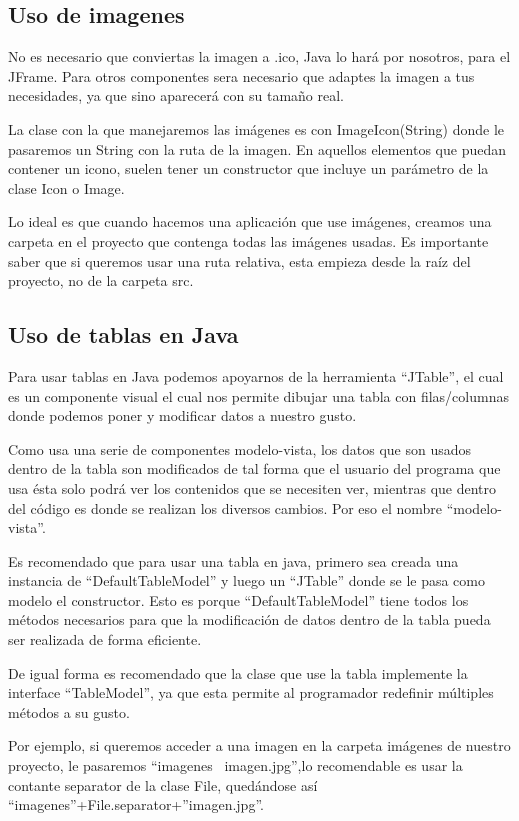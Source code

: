 \documentclass[12pt,a4paper]{report}
\begin{document}
{\subsection*{Uso de imagenes}
No es necesario que conviertas la imagen a .ico, Java lo hará por nosotros, para el JFrame. Para otros componentes sera necesario que adaptes la imagen a tus necesidades, ya que sino aparecerá con su tamaño real.

La clase con la que manejaremos las imágenes es con ImageIcon(String) donde le pasaremos un String con la ruta de la imagen. En aquellos elementos que puedan contener un icono, suelen tener un constructor que incluye un parámetro de la clase Icon o Image.

Lo ideal es que cuando hacemos una aplicación que use imágenes, creamos una carpeta en el proyecto que contenga todas las imágenes usadas. Es importante saber que si queremos usar una ruta relativa, esta empieza desde la raíz del proyecto, no de la carpeta src.



\subsection*{Uso de tablas en Java}
Para usar tablas en Java podemos apoyarnos de la herramienta “JTable”, el cual es un componente visual el cual nos permite dibujar una tabla con filas/columnas donde podemos poner y modificar datos a nuestro gusto.

Como usa una serie de componentes modelo-vista, los datos que son usados dentro de la tabla son modificados de tal forma que el usuario del programa que usa ésta solo podrá ver los contenidos que se necesiten ver, mientras que dentro del código es donde se realizan los diversos cambios. Por eso el nombre “modelo-vista”.

Es recomendado que para usar una tabla en java, primero sea creada una instancia de “DefaultTableModel” y luego un “JTable” donde se le pasa como modelo el constructor. Esto es porque “DefaultTableModel” tiene todos los métodos necesarios para que la modificación de datos dentro de la tabla pueda ser realizada de forma eficiente.

De igual forma es recomendado que la clase que use la tabla implemente la interface “TableModel”, ya que esta permite al programador redefinir múltiples métodos a su gusto.

Por ejemplo, si queremos acceder a una imagen en la carpeta imágenes de nuestro proyecto, le pasaremos “imagenes \ imagen.jpg”,lo recomendable es usar la contante separator de la clase File, quedándose así “imagenes”+File.separator+”imagen.jpg”.

}
\end{document}

